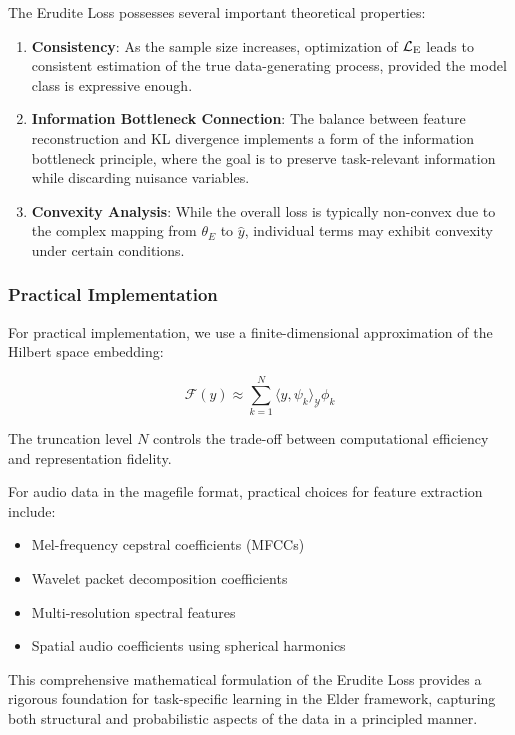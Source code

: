 The Erudite Loss possesses several important theoretical properties:

\begin{enumerate}
\item \textbf{Consistency}: As the sample size increases, optimization of $\mathcal{L}_{\text{E}}$ leads to consistent estimation of the true data-generating process, provided the model class is expressive enough.

\item \textbf{Information Bottleneck Connection}: The balance between feature reconstruction and KL divergence implements a form of the information bottleneck principle, where the goal is to preserve task-relevant information while discarding nuisance variables.

\item \textbf{Convexity Analysis}: While the overall loss is typically non-convex due to the complex mapping from $\theta_E$ to $\hat{y}$, individual terms may exhibit convexity under certain conditions.
\end{enumerate}

\subsubsection{Practical Implementation}

For practical implementation, we use a finite-dimensional approximation of the Hilbert space embedding:

\begin{equation}
\mathcal{F}(y) \approx \sum_{k=1}^{N} \langle y, \psi_k \rangle_{\mathcal{Y}} \phi_k
\end{equation}

The truncation level $N$ controls the trade-off between computational efficiency and representation fidelity.

For audio data in the magefile format, practical choices for feature extraction include:
\begin{itemize}
\item Mel-frequency cepstral coefficients (MFCCs)
\item Wavelet packet decomposition coefficients
\item Multi-resolution spectral features
\item Spatial audio coefficients using spherical harmonics
\end{itemize}

This comprehensive mathematical formulation of the Erudite Loss provides a rigorous foundation for task-specific learning in the Elder framework, capturing both structural and probabilistic aspects of the data in a principled manner.